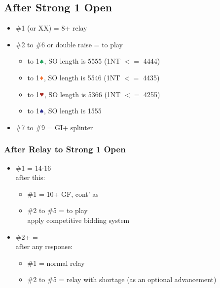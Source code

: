 \documentclass{article}
\begin{document}
\begin{multicols}{2}
\subsection{After Strong 1 Open}\label{sec:strong-1}
\begin{itemize}
    \item \#1 (or XX) = 8+ relay
    \item \#2 to \#6 or double raise = to play
    \begin{itemize}
        \item to 1$\ccc$, SO length is 5555 (1NT $<=$ 4444)
        \item to 1$\ddd$, SO length is 5546 (1NT $<=$ 4435)
        \item to 1$\hhh$, SO length is 5366 (1NT $<=$ 4255)
        \item to 1$\sss$, SO length is 1555
    \end{itemize}
    \item \#7 to \#9 = GI+ splinter
\end{itemize}

\subsubsection{After Relay to Strong 1 Open}
\begin{itemize}
    \item \#1 = 14-16 \\
        after this:
        \begin{itemize}
            \item \#1 = 10+ GF, cont' as 
            \item \#2 to \#5 = to play \\
                apply competitive bidding system
        \end{itemize}
    \item \#2+ =  \\
        after any response:
        \begin{itemize}
            \item \#1 = normal relay
            \item \#2 to \#5 = relay with shortage (as an optional advancement)
        \end{itemize}
\end{itemize}


\end{multicols}
\end{document}
